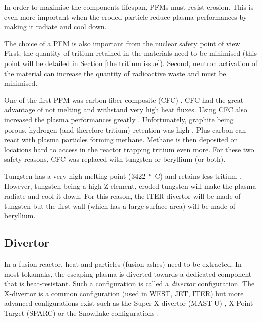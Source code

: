 In order to maximise the components lifespan, PFMs must resist erosion.
This is even more important when the eroded particle reduce plasma performances by making it radiate and cool down.

The choice of a PFM is also important from the nuclear safety point of view.
First, the quantity of tritium retained in the materials need to be minimised (this point will be detailed in Section \ref{the tritium issue}).
Second, neutron activation of the material can increase the quantity of radioactive waste and must be minimised.

One of the first PFM was carbon fiber composite (CFC) .
CFC had the great advantage of not melting and withstand very high heat fluxes.
Using CFC also increased the plasma performances greatly .
Unfortunately, graphite being porous, hydrogen (and therefore tritium) retention was high .
Plus carbon can react with plasma particles forming methane.
Methane is then deposited on locations hard to access in the reactor trapping tritium even more.
For these two safety reasons, CFC was replaced with tungsten or beryllium (or both).

Tungsten has a very high melting point (\SI{3422}{°C}) and retains less tritium .
However, tungsten being a high-Z element, eroded tungsten will make the plasma radiate and cool it down.
For this reason, the ITER divertor will be made of tungsten but the first wall (which has a large surface area) will be made of beryllium.

\subsection{Divertor}

In a fusion reactor, heat and particles (fusion ashes) need to be extracted.
In most tokamaks, the escaping plasma is diverted towards a dedicated component that is heat-resistant.
Such a configuration is called a \textit{divertor} configuration.
The X-divertor is a common configuration (used in WEST, JET, ITER) but more advanced configurations exist such as the Super-X divertor (MAST-U) , X-Point Target (SPARC)  or the Snowflake configurations .

